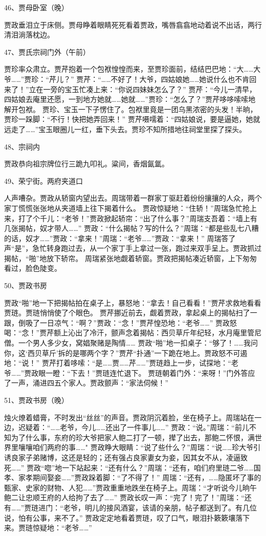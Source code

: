 46、贾母卧室（晚）\par
贾政垂泪立于床侧。贾母睁着眼睛死死看着贾政，嘴唇翕翕地动着说不出话，两行清泪淌落枕边。

47、贾氏宗祠门外（午前）\par
贾珍率众肃立。贾芹抱着一个包袱惶惶而来，至贾珍面前，结结巴巴地：“大……大爷……”贾珍：“芹儿？”
贾芹：“……不好了！大爷，四姑娘她……她说什么也不肯回来了！”立在一旁的宝玉忙凑上来：“你说四妹妹怎么了？”
贾芹：“今儿一清早，四姑娘去庵里还愿，一到地方她就……她就……”贾珍：“怎么了？”贾芹哆哆嗦嗦地解开包袱。
贾珍、宝玉一下子愣住了。包袱里竟是一团乌黑浓密的头发！半晌，贾珍一跺脚：“不行！快把她弄回来！”
贾芹嗫嚅着：“四姑娘说，要是逼她，她就远走了……”宝玉眼圈儿一红，垂下头去。贾珍不知所措地往祠堂里探了探头。

48、宗祠内\par
贾政恭向祖宗牌位行三跪九叩礼。粱间，香烟氤氲。

49、荣宁街。两府夹道口\par
人声嘈杂。贾政从轿窗内望出去。周瑞带着一群家丁驱赶着纷纷攘攘的人众，两个家丁慌慌张张地从夹道墙上往下揭着什么。
贾政惊疑地：“住轿！”周瑞急忙抢上来，打了个千儿：“老爷！”贾政掀起轿帘：“出了什么事？”周瑞支吾着：“墙上有几张揭帖，奴才带人……”
贾政：“什么揭帖？写的什么？”周瑞：“都是些乱七八糟的话，奴才……”贾政：“拿来！”周瑞：“老爷……”贾政：“拿来！”
周瑞答了声“是”，急忙转身跑过去，从一个家丁手上拿过一张，跑过来双手呈上。贾政抓过揭帖，“啪”地放下轿帘。
周瑞紧张地觑着轿窗。贾政把揭帖凑近轿窗，上下匆匆看过，脸色陡变。

50、贾政书房\par
贾政“啪”地一下把揭帖拍在桌子上，暴怒地：“拿去！自己看看！”贾芹求救地看看贾琏。贾琏悄悄使了个眼色。
贾芹挪近前去，觑着贾政，拿起桌上的揭帖扫了一跟，倒吸了一日凉气：“啊？”贾政：“念！”贾芹惶恐地：“老爷……”
贾政怒喝：“念！”贾芹额上沁出了冷汗，颤声念着揭帖：西贝草斤年纪轻，水月庵里管尼僧。一个男人多少女，窝娼聚赌是陶情……
贾政“啪”地一扣桌子：“够了！……我问你，这‘西贝草斤’拆的是哪两个字？”贾芹“扑通”一下跪在地上。贾政怒不可遏地：“说！”
贾芹打着哆嗦：“是……贾……芹……”贾琏趋上一步，试探地：“老爷……”贾政眼一瞪：“下去！”贾琏连忙退下。
贾琏朝着门外：“来呀！”门外答应了一声，涌进四五个家人。贾政颤声：“家法伺候！”

51、贾政书房（晚）\par
烛火燎着蜡膏，不时发出“丝丝”的声音。贾政阴沉着脸，坐在椅子上。周瑞站在一边，迟疑着：“……老爷，今儿……还出了一件事儿……”
贾政：“说。”周瑞：“前儿不知为了什么事，东府的珍大爷把家人鲍二打了一顿，撵了出去，那鲍二怀恨，满世界里嚷嚷咱们两府的事……"
贾政睁大眼睛：“说了些什么？”周瑞：“说……珍大爷引诱良家子弟赌博，这还是轻的；还有强占良家妻女为妾，因其女不从，凌逼致死……”
贾政“唿”地一下站起来：“还有什么？”周瑞：“还有，咱们府里琏二爷……国孝、家孝期间娶妾……”贾政跺着脚：“了不得了！”
周瑞：“还有，……隐匿坏了事的甄家、史家的财物、人犯……”贾政重重地跌坐在椅子上。周瑞：“才听说今儿晌午鲍二让忠顺王府的人给拘了去了……”
贾政长叹一声：“完了！完了！”周瑞：“还有……”贾琏进门：“老爷，明儿的接风酒宴，该请的亲朋，帖子都送到了。有几位说，怕有公事，来不了。”
贾政定定地看着贾琏，叹了口气，眼泪扑簌簌壤落下来。贾琏惊疑地：“老爷……”

